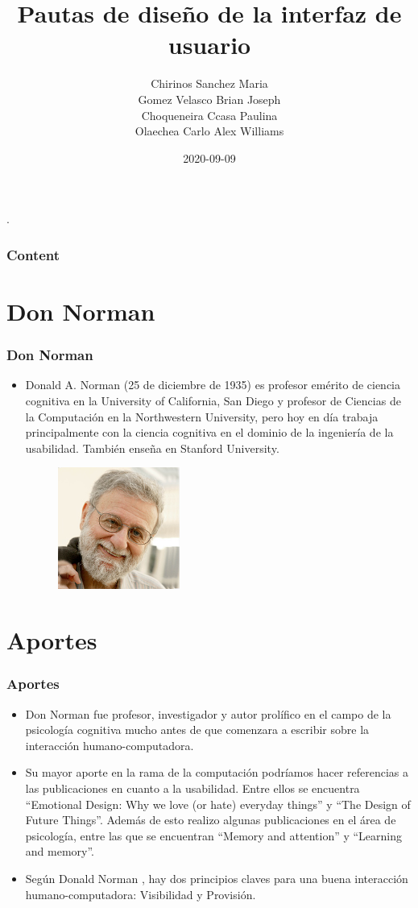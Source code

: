 \documentclass[11pt]{beamer}
\title[Introducción]{\bf\Huge Pautas de diseño de la interfaz de usuario}
\author[rescobedoq]
{
    Chirinos Sanchez Maria\inst{1}\\
	Gomez Velasco Brian Joseph \inst{2}\\
	Choqueneira Ccasa Paulina \inst{3}\\
	Olaechea Carlo Alex Williams\inst{4}
}
\institute[UNSA]
{
\inst{1}%
System Engineering School\\
}
\date[2020-09-09]{\scriptsize{2020-09-09}}
\begin{document}
\begin{frame}
\titlepage
.\end{frame}

\begin{frame}
\frametitle{Content}
\tableofcontents
\end{frame}

\section{Don Norman}
\begin{frame}
\frametitle{Don Norman}
\begin{itemize}
 \item  Donald A. Norman (25 de diciembre de 1935) es profesor emérito de ciencia cognitiva en la University of California, San Diego y profesor de Ciencias de la Computación en la Northwestern University, pero hoy en día trabaja principalmente con la ciencia cognitiva en el dominio de la ingeniería de la usabilidad. También enseña en Stanford University.

\begin{figure}[t]
\includegraphics[width=4cm, height=4cm]{norman-don.jpg}
\centering
\end{figure}
\end{itemize}
\end{frame}

\section{Aportes}
\begin{frame}
\frametitle{Aportes}
\begin{itemize}
\item Don Norman fue profesor, investigador y autor prolífico en el campo de la psicología cognitiva mucho antes de que comenzara a escribir sobre la interacción humano-computadora. 
\item Su mayor aporte en la rama de la computación podríamos hacer referencias a las publicaciones en cuanto a la usabilidad. Entre ellos se encuentra “Emotional Design: Why we love (or hate) everyday things” y “The Design of Future Things”. Además de esto realizo algunas publicaciones en el área de psicología, entre las que se encuentran “Memory and attention” y “Learning and memory”.
\item  Según Donald Norman , hay dos principios claves para una buena interacción humano-computadora: Visibilidad y Provisión.
\end{itemize}
\end{frame}
\end{document}
